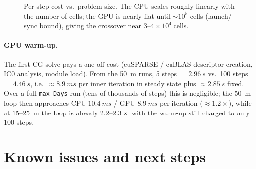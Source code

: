 \documentclass[11pt,a4paper]{article}
\begin{document}
\begin{figure}[h]
\centering
{}
\caption{Per-step cost vs.\ problem size. The CPU scales roughly linearly with
the number of cells; the GPU is nearly flat until $\sim\!10^{5}$ cells
(launch/-sync bound), giving the crossover near $3\text{--}4\times10^{4}$ cells.}
\end{figure}

\paragraph{GPU warm-up.} The first CG solve pays a one-off cost (cuSPARSE /
cuBLAS descriptor creation, IC0 analysis, module load). From the \SI{50}{m}
runs, 5 steps $=\SI{2.96}{s}$ vs.\ 100 steps $=\SI{4.46}{s}$, i.e.\
$\approx\SI{8.9}{ms}$ per inner iteration in steady state plus
$\approx\SI{2.85}{s}$ fixed. Over a full \texttt{max\_Days} run (tens of
thousands of steps) this is negligible; the \SI{50}{m} loop then approaches
CPU $\SI{10.4}{ms}$ / GPU $\SI{8.9}{ms}$ per iteration ($\approx1.2\times$),
while at $15\text{--}25$~m the loop is already $2.2\text{--}2.3\times$ with the
warm-up still charged to only 100 steps.

\section{Known issues and next steps}
\label{sec:issues}
\end{document}
